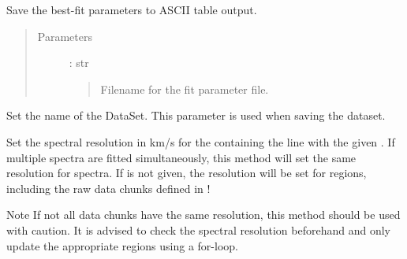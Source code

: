 \documentclass[letterpaper,10pt,english]{sphinxmanual}
\begin{document}
\begin{fulllineitems}

\begin{fulllineitems}
\label{\detokenize{api:VoigtFit.DataSet.save_parameters}}
Save the best-fit parameters to ASCII table output.
\begin{quote}\begin{description}
\item[{Parameters}] \leavevmode
{} : str
\begin{quote}

Filename for the fit parameter file.
\end{quote}

\end{description}\end{quote}

\end{fulllineitems}


\begin{fulllineitems}
\label{\detokenize{api:VoigtFit.DataSet.set_name}}
Set the name of the DataSet. This parameter is used when saving the dataset.

\end{fulllineitems}


\begin{fulllineitems}
\label{\detokenize{api:VoigtFit.DataSet.set_resolution}}
Set the spectral resolution in km/s for the {\hyperref[\detokenize{api:regions.Region}]{}}
containing the line with the given . If multiple spectra are fitted
simultaneously, this method will set the same resolution for  spectra.
If  is not given, the resolution will be set for  regions,
including the raw data chunks defined in !

Note \textendash{} If not all data chunks have the same resolution, this method
should be used with caution. It is advised to check the spectral resolution beforehand
and only update the appropriate regions using a for-loop.


\end{fulllineitems}
\end{fulllineitems}
\end{document}

